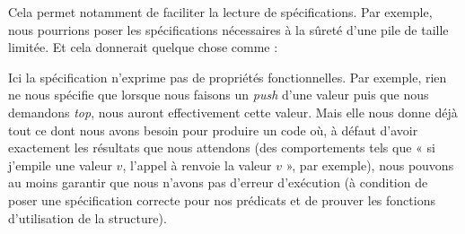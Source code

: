 Cela permet notamment de faciliter la lecture de spécifications. Par exemple, nous
pourrions poser les spécifications nécessaires à la sûreté d'une pile de taille 
limitée. Et cela donnerait quelque chose comme :






Ici la spécification n'exprime pas de propriétés fonctionnelles. Par exemple, 
rien ne nous spécifie que lorsque nous faisons un \textit{push} d'une valeur puis que nous
demandons \textit{top}, nous auront effectivement cette valeur. Mais elle nous donne 
déjà tout ce dont nous avons besoin pour produire un code où, à défaut d'avoir 
exactement les résultats que nous attendons (des comportements tels que « si 
j'empile une valeur $v$, l'appel à  renvoie la valeur $v$ », par exemple), nous
 pouvons au moins garantir que nous n'avons pas d'erreur d'exécution (à condition 
de poser une spécification correcte pour nos prédicats et de prouver les fonctions 
d'utilisation de la structure).
